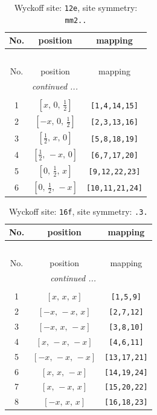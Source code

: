 \documentclass[fleqn,8pt]{jsarticle}
\begin{document}
\renewcommand{\arraystretch}{1.2}
\begin{longtable}{ccc}
\caption{Wyckoff site: {\tt 12e}, site symmetry: {\tt mm2..}}
 \\
 \hline \hline
No. & position & mapping \\ \hline \endfirsthead

\multicolumn{2}{l}{\tablename\ \thetable{}} \\
 \hline \hline
No. & position & mapping \\ \hline \endhead

 \hline \hline
\multicolumn{2}{r}{\footnotesize\it continued ...} \\ \endfoot

 \hline \hline
\multicolumn{2}{r}{} \\ \endlastfoot

1 & $\left[ x,\, 0,\, \frac{1}{2} \right]$ & {\tt [1,4,14,15]} \\ \hline
2 & $\left[ - x,\, 0,\, \frac{1}{2} \right]$ & {\tt [2,3,13,16]} \\ \hline
3 & $\left[ \frac{1}{2},\, x,\, 0 \right]$ & {\tt [5,8,18,19]} \\ \hline
4 & $\left[ \frac{1}{2},\, - x,\, 0 \right]$ & {\tt [6,7,17,20]} \\ \hline
5 & $\left[ 0,\, \frac{1}{2},\, x \right]$ & {\tt [9,12,22,23]} \\ \hline
6 & $\left[ 0,\, \frac{1}{2},\, - x \right]$ & {\tt [10,11,21,24]} \\
\end{longtable}
\renewcommand{\arraystretch}{1.2}
\begin{longtable}{ccc}
\caption{Wyckoff site: {\tt 16f}, site symmetry: {\tt .3.}}
 \\
 \hline \hline
No. & position & mapping \\ \hline \endfirsthead

\multicolumn{2}{l}{\tablename\ \thetable{}} \\
 \hline \hline
No. & position & mapping \\ \hline \endhead

 \hline \hline
\multicolumn{2}{r}{\footnotesize\it continued ...} \\ \endfoot

 \hline \hline
\multicolumn{2}{r}{} \\ \endlastfoot

1 & $\left[ x,\, x,\, x \right]$ & {\tt [1,5,9]} \\ \hline
2 & $\left[ - x,\, - x,\, x \right]$ & {\tt [2,7,12]} \\ \hline
3 & $\left[ - x,\, x,\, - x \right]$ & {\tt [3,8,10]} \\ \hline
4 & $\left[ x,\, - x,\, - x \right]$ & {\tt [4,6,11]} \\ \hline
5 & $\left[ - x,\, - x,\, - x \right]$ & {\tt [13,17,21]} \\ \hline
6 & $\left[ x,\, x,\, - x \right]$ & {\tt [14,19,24]} \\ \hline
7 & $\left[ x,\, - x,\, x \right]$ & {\tt [15,20,22]} \\ \hline
8 & $\left[ - x,\, x,\, x \right]$ & {\tt [16,18,23]} \\
\end{longtable}
\end{document}
